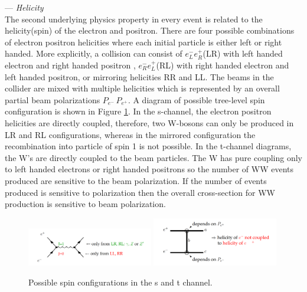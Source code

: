 --- \textit{Helicity}\\
The second underlying physics property in every event is related to the helicity(spin) of the electron and positron. There are four possible combinations of electron positron helicities where each initial particle is either left or right handed. More explicitly, a collision can consist of  $e^-_L e^+_R$(LR) with left handed electron and right handed positron , $e^-_R e^+_L$(RL)  with right handed electron and left handed positron, or mirroring helicities RR and LL.  The beams in the collider are mixed with multiple helicities which is represented by an overall partial beam polarizations $P_{e^-} \, P_{e^+}$. A diagram of possible tree-level spin configuration is shown in Figure \ref{fig:spindiag}. In the s-channel, the electron positron helicities  are directly coupled, therefore, two W-bosons can only be produced in LR and RL configurations, whereas in the mirrored configuration the  recombination into particle of spin 1 is  not possible. In the t-channel diagrams, the W's are directly coupled to the beam particles. The W has pure coupling only to left handed electrons or right handed positrons so the number of  WW events produced are sensitive to the beam polarization.  If the number of events produced is sensitive to polarization then the overall cross-section for WW production is sensitive to beam polarization. 

\begin{figure}
\label{fig:spindiag}
\includegraphics[width=0.49\textwidth]{helicity1.pdf}
\includegraphics[width=0.49\textwidth]{helicity2.pdf}
\caption{Possible spin configurations in the s and t channel. \cite{helicity}}
\end{figure}


